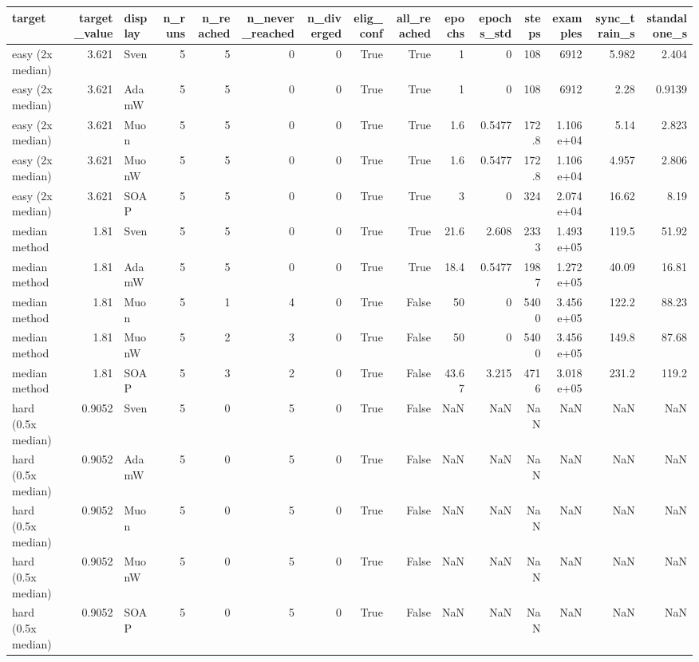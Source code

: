 \begin{tabular}{lrlrrrrrrrrrrrr}
\toprule
target & target\_value & display & n\_runs & n\_reached & n\_never\_reached & n\_diverged & elig\_conf & all\_reached & epochs & epochs\_std & steps & examples & sync\_train\_s & standalone\_s \\
\midrule
easy (2x median) & 3.621 & Sven & 5 & 5 & 0 & 0 & True & True & 1 & 0 & 108 & 6912 & 5.982 & 2.404 \\
easy (2x median) & 3.621 & AdamW & 5 & 5 & 0 & 0 & True & True & 1 & 0 & 108 & 6912 & 2.28 & 0.9139 \\
easy (2x median) & 3.621 & Muon & 5 & 5 & 0 & 0 & True & True & 1.6 & 0.5477 & 172.8 & 1.106e+04 & 5.14 & 2.823 \\
easy (2x median) & 3.621 & MuonW & 5 & 5 & 0 & 0 & True & True & 1.6 & 0.5477 & 172.8 & 1.106e+04 & 4.957 & 2.806 \\
easy (2x median) & 3.621 & SOAP & 5 & 5 & 0 & 0 & True & True & 3 & 0 & 324 & 2.074e+04 & 16.62 & 8.19 \\
median method & 1.81 & Sven & 5 & 5 & 0 & 0 & True & True & 21.6 & 2.608 & 2333 & 1.493e+05 & 119.5 & 51.92 \\
median method & 1.81 & AdamW & 5 & 5 & 0 & 0 & True & True & 18.4 & 0.5477 & 1987 & 1.272e+05 & 40.09 & 16.81 \\
median method & 1.81 & Muon & 5 & 1 & 4 & 0 & True & False & 50 & 0 & 5400 & 3.456e+05 & 122.2 & 88.23 \\
median method & 1.81 & MuonW & 5 & 2 & 3 & 0 & True & False & 50 & 0 & 5400 & 3.456e+05 & 149.8 & 87.68 \\
median method & 1.81 & SOAP & 5 & 3 & 2 & 0 & True & False & 43.67 & 3.215 & 4716 & 3.018e+05 & 231.2 & 119.2 \\
hard (0.5x median) & 0.9052 & Sven & 5 & 0 & 5 & 0 & True & False & NaN & NaN & NaN & NaN & NaN & NaN \\
hard (0.5x median) & 0.9052 & AdamW & 5 & 0 & 5 & 0 & True & False & NaN & NaN & NaN & NaN & NaN & NaN \\
hard (0.5x median) & 0.9052 & Muon & 5 & 0 & 5 & 0 & True & False & NaN & NaN & NaN & NaN & NaN & NaN \\
hard (0.5x median) & 0.9052 & MuonW & 5 & 0 & 5 & 0 & True & False & NaN & NaN & NaN & NaN & NaN & NaN \\
hard (0.5x median) & 0.9052 & SOAP & 5 & 0 & 5 & 0 & True & False & NaN & NaN & NaN & NaN & NaN & NaN \\
\bottomrule
\end{tabular}
